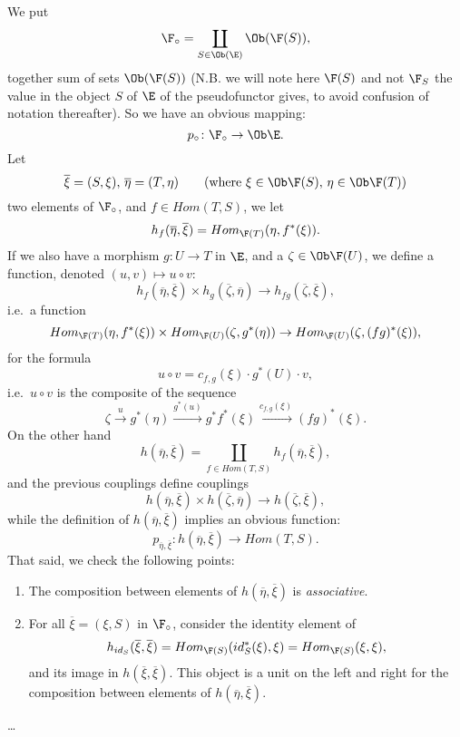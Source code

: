We put 
\[\F_\circ = \coprod_{S \in \Ob (\E)} \Ob(\F(S)),\] 
together sum of sets $\Ob(\F (S))$ (N.B. we will note here $\F(S)$ and not $\F_S$ the value in the object $S$ of $\E$ of the pseudofunctor gives, to avoid confusion of notation thereafter). So we have an obvious mapping: 
\[p_\circ \colon \F_\circ \to \Ob \E.\]
Let 
\[\overline\xi = (S, \xi), \, \overline \eta = (T, \eta) \qquad (\text{where } \xi \in \Ob \F(S), \, \eta \in \Ob \F(T))\]
two elements of $\F_\circ$, and $f \in Hom(T,S)$, we let
\[h_f(\overline \eta, \overline \xi) = Hom_{\F(T)}(\eta, f^\ast(\xi)).\]
If we also have a morphism $g \colon U \to T$ in $\E$, and a $\zeta \in \Ob \F (U)$, we define a function, denoted $(u,v) \mapsto u \circ v$:
\[h_f(\overline \eta, \overline \xi) \times h_g(\overline \zeta, \overline \eta) \to h_{fg}(\overline \zeta, \overline \xi),\]
i.e.\ a function
\[Hom_{\F(T)} (\eta, f^\ast(\xi)) \times Hom_{\F(U)} (\zeta, g^\ast(\eta)) \to Hom_{\F(U)} (\zeta, (fg)^\ast(\xi)),\]
for the formula
\[u \circ v = c_{f,g} (\xi) \cdot g^\ast(U) \cdot v,\]
i.e.\ $u \circ v$ is the composite of the sequence 
\[
\zeta \xrightarrow{u} g^\ast(\eta) \xrightarrow{g^\ast(u)} g^\ast f^\ast(\xi) \xrightarrow{c_{f,g}(\xi)} (fg)^\ast(\xi).\]
On the other hand 
\[
    h(\overline \eta, \overline \xi) = \coprod_{f \in Hom(T,S)} h_f(\overline \eta, \overline \xi),
\]
and the previous couplings define couplings
\[h(\overline \eta, \overline \xi) \times h(\overline \zeta, \overline \eta) \to h(\overline \zeta, \overline \xi),\]
while the definition of $h (\overline \eta, \overline \xi)$ implies an obvious function:
\[p_{\overline \eta, \overline \xi}
\colon h(\overline \eta, \overline \xi) \to Hom(T, S).\]
That said, we check the following points:
\begin{enumerate}
    \item The composition between elements of $h (\overline \eta, \overline \xi)$ is \emph{associative}.
    \item For all $\overline \xi = (\xi, S)$ in $\F_\circ$, consider the identity element of
    \[h_{id_S} (\overline \xi, \overline \xi) = Hom_{\F(S)} (id_S^\ast(\xi), \xi) = Hom_{\F(S)}(\xi,\xi),\]
    and its image in $h (\overline \xi,\overline \xi)$. This object is a unit on the left and right for the composition between elements of $h (\overline \eta, \overline \xi)$.
\end{enumerate}
\dots
